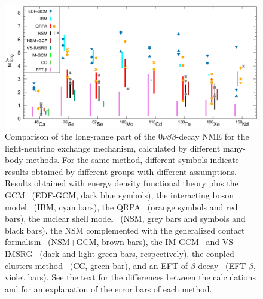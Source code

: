 \begin{figure}[t]
	\begin{center}
	\includegraphics[width=1.02\textwidth]{img/nme_2023.eps}
	\caption{Comparison of the long-range part of the $0\nu\beta\beta$-decay NME for the light-neutrino exchange mechanism, calculated by different many-body methods. For the same method, different symbols indicate results obtained by different groups with different assumptions. Results obtained with energy density functional theory plus the GCM~\cite{Rodriguez:2010mn,LopezVaquero:2013yji,Yao:2014uta} (EDF-GCM, dark blue symbols), the interacting boson model~\cite{Barea:2015kwa,Deppisch:2020ztt} (IBM, cyan bars), the QRPA~\cite{Hyvarinen:2015bda,Simkovic:2018hiq,Mustonen:2013zu,Fang:2018tui,Terasaki:2014rba,Terasaki:2019rbu,Terasaki:2020ndc,Jokiniemi:2022ayc} (orange symbols and red bars), the nuclear shell model~\cite{Horoi:2015tkc,Iwata:2016cxn,Menendez:2017fdf,Horoi:2022ley,Horoi:2023uah,Coraggio:2020hwx,Coraggio:2022vgy,Tsunoda:2023fqw,Jokiniemi:2022ayc} (NSM, grey bars and symbols and black bars), the NSM complemented with the generalized contact formalism~\cite{Weiss:2021rig} (NSM+GCM, brown bars), the IM-GCM~\cite{Yao:2020olm} and VS-IMSRG~\cite{Belley:2020ejd} (dark and light green bars, respectively), the coupled clusters method~\cite{Novario:2020dmr} (CC, green bar), and an EFT of $\beta$ decay~\cite{Brase:2021uny} (EFT-$\beta$, violet bars). See the text for the differences between the calculations and for an explanation of the error bars of each method. \label{fig:NME_long}}
\end{center}
\end{figure}

